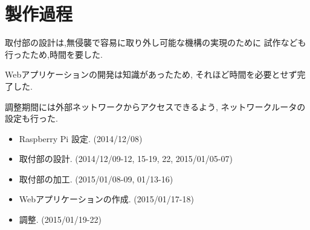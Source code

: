 \section{製作過程}
取付部の設計は,無侵襲で容易に取り外し可能な機構の実現のために
試作なども行ったため,時間を要した.

Webアプリケーションの開発は知識があったため,
それほど時間を必要とせず完了した.

調整期間には外部ネットワークからアクセスできるよう,
ネットワークルータの設定も行った.

\begin{itemize}[noitemsep]
  \item Raspberry Pi 設定. (2014/12/08)
  \item 取付部の設計. (2014/12/09-12, 15-19, 22, 2015/01/05-07)
  \item 取付部の加工. (2015/01/08-09, 01/13-16)
  \item Webアプリケーションの作成. (2015/01/17-18)
  \item 調整. (2015/01/19-22)
\end{itemize}

